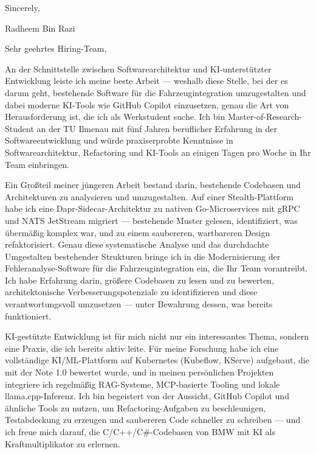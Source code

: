 \documentclass[11pt,a4paper]{coverletter}
\begin{document}
\closing{Sincerely,}{Radheem Bin Razi}

\clearpage
{}


\opening{Sehr geehrtes Hiring-Team,}

An der Schnittstelle zwischen Softwarearchitektur und KI-unterstützter Entwicklung leiste ich meine beste Arbeit — weshalb diese Stelle, bei der es darum geht, bestehende Software für die Fahrzeugintegration umzugestalten und dabei moderne KI-Tools wie GitHub Copilot einzusetzen, genau die Art von Herausforderung ist, die ich als Werkstudent suche. Ich bin Master-of-Research-Student an der TU Ilmenau mit fünf Jahren beruflicher Erfahrung in der Softwareentwicklung und würde praxiserprobte Kenntnisse in Softwarearchitektur, Refactoring und KI-Tools an einigen Tagen pro Woche in Ihr Team einbringen.

Ein Großteil meiner jüngeren Arbeit bestand darin, bestehende Codebasen und Architekturen zu analysieren und umzugestalten. Auf einer Stealth-Plattform habe ich eine Dapr-Sidecar-Architektur zu nativen Go-Microservices mit gRPC und NATS JetStream migriert — bestehende Muster gelesen, identifiziert, was übermäßig komplex war, und zu einem saubereren, wartbareren Design refaktorisiert. Genau diese systematische Analyse und das durchdachte Umgestalten bestehender Strukturen bringe ich in die Modernisierung der Fehleranalyse-Software für die Fahrzeugintegration ein, die Ihr Team vorantreibt. Ich habe Erfahrung darin, größere Codebasen zu lesen und zu bewerten, architektonische Verbesserungspotenziale zu identifizieren und diese verantwortungsvoll umzusetzen — unter Bewahrung dessen, was bereits funktioniert.

KI-gestützte Entwicklung ist für mich nicht nur ein interessantes Thema, sondern eine Praxis, die ich bereits aktiv leite. Für meine Forschung habe ich eine vollständige KI/ML-Plattform auf Kubernetes (Kubeflow, KServe) aufgebaut, die mit der Note 1.0 bewertet wurde, und in meinen persönlichen Projekten integriere ich regelmäßig RAG-Systeme, MCP-basierte Tooling und lokale llama.cpp-Inferenz. Ich bin begeistert von der Aussicht, GitHub Copilot und ähnliche Tools zu nutzen, um Refactoring-Aufgaben zu beschleunigen, Testabdeckung zu erzeugen und saubereren Code schneller zu schreiben — und ich freue mich darauf, die C/C++/C\#-Codebasen von BMW mit KI als Kraftmultiplikator zu erlernen.
\end{document}
